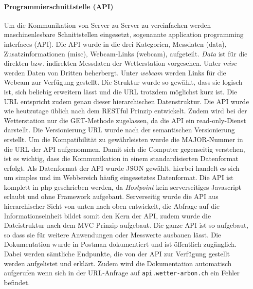 \documentclass[10pt]{article}
\begin{document}
\begin{multicols}{2}
\paragraph{Programmierschnittstelle (API)}
Um die Kommunikation von Server zu Server zu vereinfachen werden maschinenlesbare Schnittstellen eingesetzt, sogenannte application programming interfaces (API). Die API wurde in die drei Kategorien, Messdaten (data), Zusatzinformationen (misc), Webcam-Links (webcam), aufgeteilt. \emph{Data} ist für die direkten bzw. indirekten Messdaten der Wetterstation vorgesehen. Unter \emph{misc} werden Daten von Dritten beherbergt. Unter \emph{webcam} werden Links für die Webcam zur Verfügung gestellt. Die Struktur wurde so gewählt, dass sie logisch ist, sich beliebig erweitern lässt und die URL trotzdem möglichst kurz ist. Die URL entspricht zudem genau dieser hierarchischen Datenstruktur. Die API wurde wie heutzutage üblich nach dem RESTful Prinzip entwickelt. Zudem wird bei der Wetterstation nur die GET-Methode zugelassen, da die API ein read-only-Dienst darstellt. Die Versionierung URL wurde nach der semantischen Versionierung erstellt. Um die Kompatibilität zu gewährleisten wurde die MAJOR-Nummer in die URL der API aufgenommen. Damit sich die Computer gegenseitig verstehen, ist es wichtig, dass die Kommunikation in einem standardisierten Datenformat erfolgt. Als Datenformat der API wurde JSON gewählt, hierbei handelt es sich um simples und im Webbereich häufig eingesetztes Datenformat. Die API ist komplett in php geschrieben werden, da \textit{Hostpoint} kein serverseitiges Javascript erlaubt und ohne Framework aufgebaut. Serverseitig wurde die API aus hierarchischer Sicht von unten nach oben entwickelt, die Abfrage auf die Informationseinheit bildet somit den Kern der API, zudem wurde die Dateistruktur nach dem MVC-Prinzip aufgebaut. Die ganze API ist so aufgebaut, so dass sie für weitere Anwendungen oder Messwerte ausbauen lässt. Die Dokumentation wurde in Postman dokumentiert und ist öffentlich zugänglich. Dabei werden sämtliche Endpunkte, die von der API zur Verfügung gestellt werden aufgelistet und erklärt. Zudem wird die Dokumentation automatisch aufgerufen wenn sich in der URL-Anfrage auf \texttt{api.wetter-arbon.ch} ein Fehler befindet.

\end{multicols}
\end{document}
